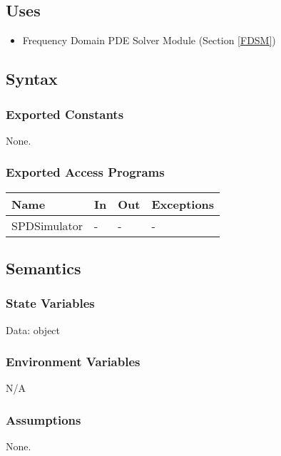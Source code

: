 \documentclass[12pt, titlepage]{article}
\begin{document}
\subsection{Uses}
\begin{itemize}
	\item Frequency Domain PDE Solver Module (Section \ref{FDSM})
\end{itemize}

\subsection{Syntax}

\subsubsection{Exported Constants}
None.
\subsubsection{Exported Access Programs}

\begin{center}
	\begin{tabular}{p{4cm} p{4cm} p{4cm} p{2cm}}
		\hline
		\textbf{Name} & \textbf{In} & \textbf{Out} & \textbf{Exceptions} \\
		\hline
		SPDSimulator & - & - & - \\
		\hline
	\end{tabular}
\end{center}

\subsection{Semantics}

\subsubsection{State Variables}

Data: object

\subsubsection{Environment Variables}
N/A
 
\subsubsection{Assumptions}
None.
\end{document}
